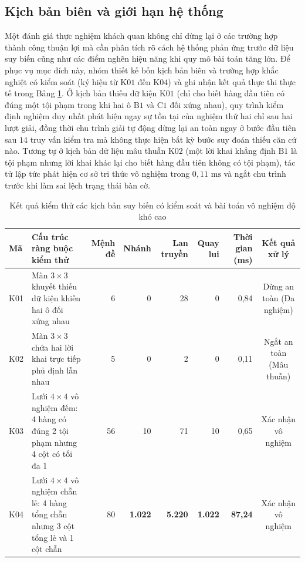 \subsection{Kịch bản biên và giới hạn hệ thống}
\label{subsec:exp_limitations}
Một đánh giá thực nghiệm khách quan không chỉ dừng lại ở các trường hợp thành công
thuận lợi mà cần phân tích rõ cách hệ thống phản ứng trước dữ liệu suy biến cũng
như các điểm nghẽn hiệu năng khi quy mô bài toán tăng lớn. Để phục vụ mục đích
này, nhóm thiết kế bốn kịch bản biên và trường hợp khắc nghiệt có kiểm soát (ký
hiệu từ $\text{K01}$ đến $\text{K04}$) và ghi nhận kết quả thực thi thực tế trong
Bảng \ref{tab:failure_stress}. Ở kịch bản thiếu dữ kiện $\text{K01}$ (chỉ cho biết
hàng đầu tiên có đúng một tội phạm trong khi hai ô $\text{B1}$ và $\text{C1}$ đối
xứng nhau), quy trình kiểm định nghiệm duy nhất phát hiện ngay sự tồn tại của
nghiệm thứ hai chỉ sau hai lượt giải, đồng thời chu trình giải tự động dừng lại an
toàn ngay ở bước đầu tiên sau $14$ truy vấn kiểm tra mà không thực hiện bất kỳ bước
suy đoán thiếu căn cứ nào. Tương tự ở kịch bản dữ liệu mâu thuẫn $\text{K02}$ (một
lời khai khẳng định $\text{B1}$ là tội phạm nhưng lời khai khác lại cho biết hàng
đầu tiên không có tội phạm), tác tử lập tức phát hiện cơ sở tri thức vô nghiệm
trong $0{,}11\text{ ms}$ và ngắt chu trình trước khi làm sai lệch trạng thái bàn
cờ.

\begin{table}[H]
\centering
\caption{%
    Kết quả kiểm thử các kịch bản suy biến có kiểm soát và bài toán vô nghiệm độ
    khó cao}
\label{tab:failure_stress}
\scriptsize
\setlength{\tabcolsep}{4.5pt}
\begin{tabularx}{\textwidth}{l >{\raggedright\arraybackslash}X r r r r r c}
\toprule
\textbf{Mã} & \textbf{Cấu trúc ràng buộc kiểm thử} & \textbf{Mệnh đề} &
\textbf{Nhánh} & \textbf{Lan truyền} & \textbf{Quay lui} & \textbf{Thời gian (ms)} &
\textbf{Kết quả xử lý} \\
\midrule
K01 & Màn $3\times3$ khuyết thiếu dữ kiện khiến hai ô đối xứng nhau & 6 & 0 &
28 & 0 & 0,84 & Dừng an toàn (Đa nghiệm) \\
K02 & Màn $3\times3$ chứa hai lời khai trực tiếp phủ định lẫn nhau & 5 & 0 & 2 & 0 &
0,11 & Ngắt an toàn (Mâu thuẫn) \\
K03 & Lưới $4\times4$ vô nghiệm đếm: 4 hàng có đúng 2 tội phạm nhưng 4 cột có tối
đa 1 & 56 & 10 & 71 & 10 & 0,65 & Xác nhận vô nghiệm \\
K04 & Lưới $4\times4$ vô nghiệm chẵn lẻ: 4 hàng tổng chẵn nhưng 3 cột tổng lẻ và 1
cột chẵn & 80 & \textbf{1.022} & \textbf{5.220} & \textbf{1.022} & \textbf{87,24} &
Xác nhận vô nghiệm \\
\bottomrule
\end{tabularx}
\end{table}


